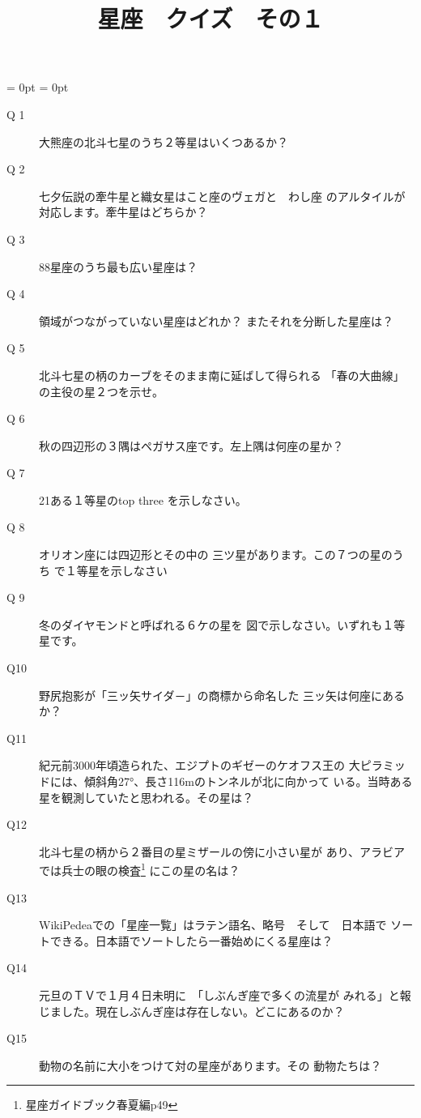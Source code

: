 \documentclass[fleqn]{article}
\begin{document}
\title{星座　クイズ　その１}
\maketitle
\hoffset = 0pt
\voffset = 0pt
\topmargin=0pt
\textheight=21cm
\headheight=0pt
\headsep=0pt
\newcommand{\CHo}{\makebox(0,0){$\bullet$}}
\newcommand{\CHc}{\makebox(0,0){$\circ$}}
\newcommand{\CHb}{\makebox(0,0){$\bigcirc$}}


\renewcommand{\descriptionlabel}[1]
{\hspace{\labelsep}\textsf{#1}}
\begin{description}
\item[Q 1]{大熊座の北斗七星のうち２等星はいくつあるか？}

\item[Q 2]{七夕伝説の牽牛星と織女星はこと座のヴェガと　わし座
のアルタイルが対応します。牽牛星はどちらか？
}
\item[Q 3]{88星座のうち最も広い星座は？}

\item[Q 4]{領域がつながっていない星座はどれか？
またそれを分断した星座は？
}

\item[Q 5]{北斗七星の柄のカーブをそのまま南に延ばして得られる
「春の大曲線」の主役の星２つを示せ。}

\item[Q 6]{秋の四辺形の３隅はペガサス座です。左上隅は何座の星か？}


\item[Q 7]{21ある１等星のtop three を示しなさい。}

\item[Q 8]{
オリオン座には四辺形とその中の
三ツ星があります。この７つの星のうち
で１等星を示しなさい}

\item[Q 9]{冬のダイヤモンドと呼ばれる６ケの星を
図で示しなさい。いずれも１等星です。

}
\item[Q10]{野尻抱影が「三ッ矢サイダ－」の商標から命名した
三ッ矢は何座にあるか？

}

\item[Q11]{紀元前3000年頃造られた、エジプトのギゼーのケオフス王の
大ピラミッドには、傾斜角27°、長さ116mのトンネルが北に向かって
いる。当時ある星を観測していたと思われる。その星は？


}


\item[Q12]{北斗七星の柄から２番目の星ミザールの傍に小さい星が
あり、アラビアでは兵士の眼の検査\footnote{
星座ガイドブック春夏編p49} にこの星の名は？
}

\item[Q13]{WikiPedeaでの「星座一覧」はラテン語名、略号　そして　日本語で
ソートできる。日本語でソートしたら一番始めにくる星座は？
}
\item[Q14]{元旦のＴＶで１月４日未明に　「しぶんぎ座で多くの流星が
みれる」と報じました。現在しぶんぎ座は存在しない。どこにあるのか？
}
\item[Q15]{動物の名前に大小をつけて対の星座があります。その
動物たちは？
}

\end{description}
\newpage
\end{document}
